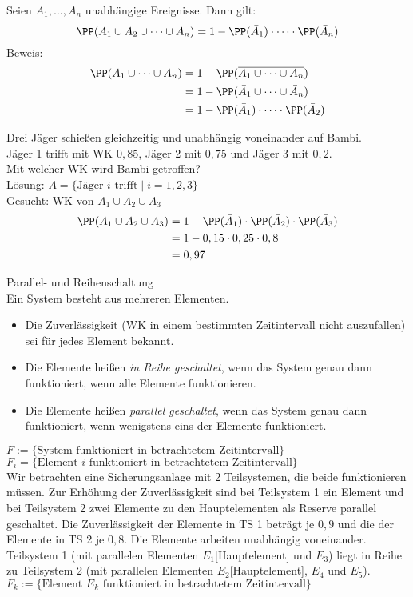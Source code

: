\documentclass{scrreprt}
\begin{document}
 Seien $A_1, \dots, A_n$ unabhängige Ereignisse. Dann gilt:
$$\PP(A_1 \cup A_2 \cup \dots \cup A_n) = 1 - \PP(\bar A_1) \cdot \dots \cdot \PP(\bar A_n)$$
Beweis: 
\begin{align*}
\PP(A_1 \cup \dots \cup A_n) &= 1 - \PP(\overline{A_1 \cup \dots \cup A_n})\\
&= 1 - \PP(\bar A_1 \cup \dots \cup \bar A_n)\\
&= 1- \PP(\bar A_1) \cdot \dots \cdot \PP(\bar A_2)
\end{align*}

 Drei Jäger schießen gleichzeitig und unabhängig voneinander auf Bambi.\\
Jäger 1 trifft mit WK $0,85$, Jäger 2 mit $0,75$ und Jäger 3 mit $0,2$.\\
Mit welcher WK wird Bambi getroffen?\\
Lösung: $A=\{\text{Jäger }i\text{ trifft}\;|\; i =1,2,3\}$\\
Gesucht: WK von $A_1 \cup A_2 \cup A_3$ 
\begin{align*}
\PP(A_1 \cup A_2 \cup A_3) &= 1 - \PP(\bar A_1) \cdot \PP(\bar A_2) \cdot \PP(\bar A_3)\\
&= 1 - 0,15\cdot 0,25 \cdot 0,8\\
&= 0,97
\end{align*}

 Parallel- und Reihenschaltung\\
Ein System besteht aus mehreren Elementen.
\begin{itemize}
\item Die Zuverlässigkeit (WK in einem bestimmten Zeitintervall nicht auszufallen) sei für jedes Element bekannt.
\item Die Elemente heißen \emph{in Reihe geschaltet}, wenn das System genau dann funktioniert, wenn alle Elemente funktionieren.
\item Die Elemente heißen \emph{parallel geschaltet}, wenn das System genau dann funktioniert, wenn wenigstens eins der Elemente funktioniert.
\end{itemize}
$F:=\{\text{System funktioniert in betrachtetem Zeitintervall}\}$\\
$F_i= \{\text{Element } i\text{ funktioniert in betrachtetem Zeitintervall}\}$\\
Wir betrachten eine Sicherungsanlage mit 2 Teilsystemen, die beide funktionieren müssen. Zur Erhöhung der Zuverlässigkeit sind bei Teilsystem 1 ein Element und bei Teilsystem 2 zwei Elemente zu den Hauptelementen als Reserve parallel geschaltet. Die Zuverlässigkeit der Elemente in TS 1 beträgt je $0,9$ und die der Elemente in TS 2 je $0,8$. Die Elemente arbeiten unabhängig voneinander.\\
Teilsystem 1 (mit parallelen Elementen $E_1$[Hauptelement] und $E_3$) liegt in Reihe zu Teilsystem 2 (mit parallelen Elementen $E_2$[Hauptelement], $E_4$ und $E_5$).\\
$F_k:= \{ \text{Element }E_k\text{ funktioniert in betrachtetem Zeitintervall}\}$
\end{document}
